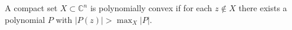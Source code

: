 
A compact set $X \subset \mathbb{C}^n$ is polynomially convex if for each $z \notin X$ there exists a polynomial $P$ with $|P(z)| > \max_X |P|$.
